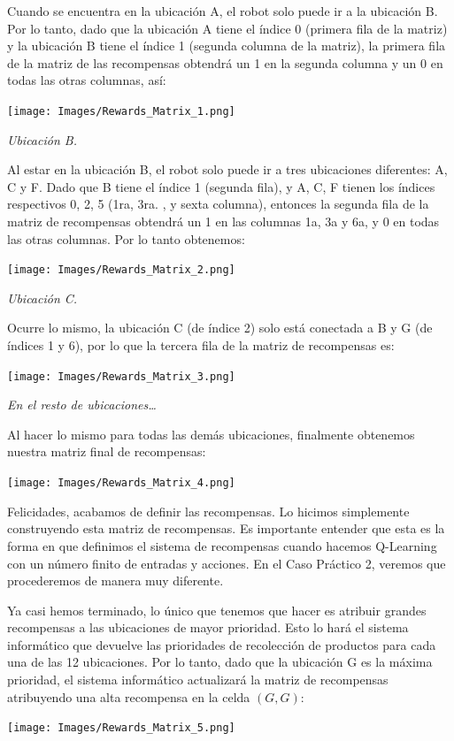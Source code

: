 \documentclass[
]{book}
\begin{document}
Cuando se encuentra en la ubicación A, el robot solo puede ir a la ubicación B. Por lo tanto, dado que la ubicación A tiene el índice 0 (primera fila de la matriz) y la ubicación B tiene el índice 1 (segunda columna de la matriz), la primera fila de la matriz de las recompensas obtendrá un 1 en la segunda columna y un 0 en todas las otras columnas, así:

\texttt{[image: Images/Rewards\_Matrix\_1.png]}

\emph{Ubicación B.}

Al estar en la ubicación B, el robot solo puede ir a tres ubicaciones diferentes: A, C y F. Dado que B tiene el índice 1 (segunda fila), y A, C, F tienen los índices respectivos 0, 2, 5 (1ra, 3ra. , y sexta columna), entonces la segunda fila de la matriz de recompensas obtendrá un 1 en las columnas 1a, 3a y 6a, y 0 en todas las otras columnas. Por lo tanto obtenemos:

\texttt{[image: Images/Rewards\_Matrix\_2.png]}

\emph{Ubicación C.}

Ocurre lo mismo, la ubicación C (de índice 2) solo está conectada a B y G (de índices 1 y 6), por lo que la tercera fila de la matriz de recompensas es:

\texttt{[image: Images/Rewards\_Matrix\_3.png]}

\emph{En el resto de ubicaciones\ldots{}}

Al hacer lo mismo para todas las demás ubicaciones, finalmente obtenemos nuestra matriz final de recompensas:

\texttt{[image: Images/Rewards\_Matrix\_4.png]}

Felicidades, acabamos de definir las recompensas. Lo hicimos simplemente construyendo esta matriz de recompensas. Es importante entender que esta es la forma en que definimos el sistema de recompensas cuando hacemos Q-Learning con un número finito de entradas y acciones. En el Caso Práctico 2, veremos que procederemos de manera muy diferente.

Ya casi hemos terminado, lo único que tenemos que hacer es atribuir grandes recompensas a las ubicaciones de mayor prioridad. Esto lo hará el sistema informático que devuelve las prioridades de recolección de productos para cada una de las 12 ubicaciones. Por lo tanto, dado que la ubicación G es la máxima prioridad, el sistema informático actualizará la matriz de recompensas atribuyendo una alta recompensa en la celda \((G, G)\):

\texttt{[image: Images/Rewards\_Matrix\_5.png]}
\end{document}
